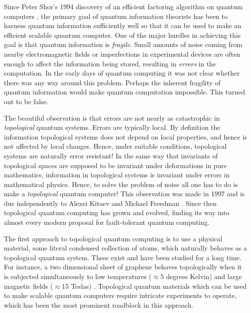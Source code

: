 Since Peter Shor’s 1994 discovery of an efficient factoring algorithm on quantum computers \cite{shor1994algorithms}, the primary goal of quantum information theorists has been to harness quantum information sufficiently well so that it can be used to make an efficient scalable quantum computer. One of the major hurdles in achieving this goal is that quantum information is {\em fragile}. Small amounts of noise coming from nearby electromagnetic fields or imperfections in experimental devices are often enough to affect the information being stored, resulting in \textit{errors} in the computation. In the early days of quantum computing it was not clear whether there was any way around this problem. Perhaps the inherent fragility of quantum information would make quantum computation impossible. This turned out to be false.

The beautiful observation is that errors are not nearly as catastrophic in {\em topological} quantum systems. Errors are typically local. By definition the information topological systems does not depend on local properties, and hence is not affected by local changes. Hence, under suitable conditions, topological systems are naturally error resistant! In the same way that invariants of topological spaces are supposed to be invariant under deformations in pure mathematics, information in topological systems is invariant under errors in mathematical physics. Hence, to solve the problem of noise all one has to do is make a {\em topological} quantum computer! This observation was made in 1997 and is due independently to Alexei Kitaev and Michael Freedman \cite{kitaev2003fault, freedman1998p}. Since then topological quantum computing has grown and evolved, finding its way into almost every modern proposal for fault-tolerant quantum computing.

The first approach to topological quantum computing is to use a physical material, some literal condensed collection of atoms, which naturally behaves as a topological quantum system. These exist and have been studied for a long time. For instance, a two dimensional sheet of graphene behaves topologically when it is subjected simultaneously to low temperatures ($\approx$5 degrees Kelvin) and large magnetic fields ($\approx$15 Teslas) \cite{bolotin2009observation}. Topological quantum materials which can be used to make scalable quantum computers require intricate experiments to operate, which has been the most prominent roadblock in this approach.

